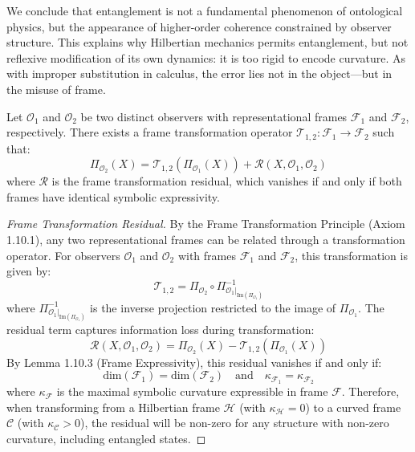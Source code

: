 \begin{scholium}
\label{scholium:bk8_on_frame_fidelity}
We conclude that entanglement is not a fundamental phenomenon of ontological physics, but the appearance of higher-order coherence constrained by observer structure. This explains why Hilbertian mechanics permits entanglement, but not reflexive modification of its own dynamics: it is too rigid to encode curvature. As with improper substitution in calculus, the error lies not in the object—but in the misuse of frame.
\end{scholium}
\begin{theorem}
\label{theorem:bk8_holographic_surface_entropy}
Let $\mathcal{O}_1$ and $\mathcal{O}_2$ be two distinct observers with representational frames $\mathcal{F}_1$ and $\mathcal{F}_2$, respectively. There exists a frame transformation operator $\mathcal{T}_{1,2}: \mathcal{F}_1 \to \mathcal{F}_2$ such that:
\[
\Pi_{\mathcal{O}_2}(X) = \mathcal{T}_{1,2}(\Pi_{\mathcal{O}_1}(X)) + \mathcal{R}(X, \mathcal{O}_1, \mathcal{O}_2)
\]
where $\mathcal{R}$ is the frame transformation residual, which vanishes if and only if both frames have identical symbolic expressivity.
\end{theorem}
\begin{proof}[Frame Transformation Residual]
\label{proof:bk8_frame_transformation_residual}
By the Frame Transformation Principle (Axiom 1.10.1), any two representational frames can be related through a transformation operator. For observers $\mathcal{O}_1$ and $\mathcal{O}_2$ with frames $\mathcal{F}_1$ and $\mathcal{F}_2$, this transformation is given by:
\begin{equation}
\mathcal{T}_{1,2} = \Pi_{\mathcal{O}_2} \circ \Pi^{-1}_{\mathcal{O}_1|_{\text{Im}(\Pi_{\mathcal{O}_1})}}
\end{equation}
where $\Pi^{-1}_{\mathcal{O}_1|_{\text{Im}(\Pi_{\mathcal{O}_1})}}$ is the inverse projection restricted to the image of $\Pi_{\mathcal{O}_1}$.
The residual term captures information loss during transformation:
\begin{equation}
\mathcal{R}(X, \mathcal{O}_1, \mathcal{O}_2) = \Pi_{\mathcal{O}_2}(X) - \mathcal{T}_{1,2}(\Pi_{\mathcal{O}_1}(X))
\end{equation}
By Lemma 1.10.3 (Frame Expressivity), this residual vanishes if and only if:
\begin{equation}
\text{dim}(\mathcal{F}_1) = \text{dim}(\mathcal{F}_2) \quad \text{and} \quad \kappa_{\mathcal{F}_1} = \kappa_{\mathcal{F}_2}
\end{equation}
where $\kappa_{\mathcal{F}}$ is the maximal symbolic curvature expressible in frame $\mathcal{F}$.
Therefore, when transforming from a Hilbertian frame $\mathcal{H}$ (with $\kappa_{\mathcal{H}} = 0$) to a curved frame $\mathcal{C}$ (with $\kappa_{\mathcal{C}} > 0$), the residual will be non-zero for any structure with non-zero curvature, including entangled states.
\end{proof}
